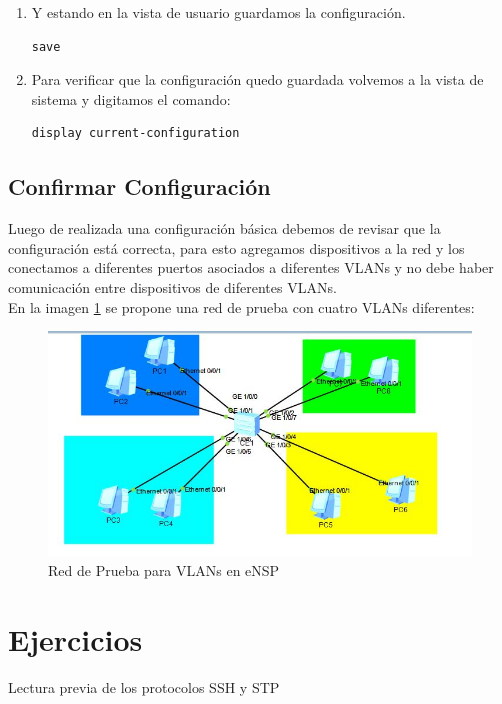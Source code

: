 \documentclass[journal]{IEEEtran}
\begin{document}
\begin{enumerate}
	\item Y estando en la vista de usuario guardamos la configuración.
	\begin{lstlisting}[frame=single]
save
	\end{lstlisting}
	
	\item Para verificar que la configuración quedo guardada volvemos a  la vista de sistema y digitamos el comando:
	\begin{lstlisting}[frame=single]
display current-configuration
	\end{lstlisting}
	
\end{enumerate}

\newpage

\subsection{\textbf{Confirmar Configuración}}
Luego de realizada una configuración básica debemos de revisar que la configuración está correcta, para esto agregamos dispositivos a la red y los conectamos a diferentes puertos asociados a diferentes VLANs y no debe haber comunicación entre dispositivos de diferentes VLANs. \\

En la imagen \ref{ensp} se propone una red de prueba con cuatro VLANs diferentes:

\begin{figure}[ht]
	\centering
	\includegraphics[scale=0.5]{2.jpg}
	\caption{Red de Prueba para VLANs en eNSP}
	\label{ensp}
\end{figure}

\section{Ejercicios}
Lectura previa de los protocolos SSH y STP
\end{document}
